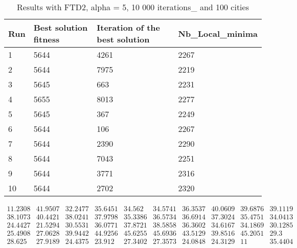 \documentclass[12pt,oneside,a4paper]{article}
\begin{document}
\begin{table}[h]
  \centering
  \small
  \begin{tabular}{llll}
    \hline
    \multicolumn{1}{|l|}{\textbf{Run}}& \multicolumn{1}{l|}{\textbf{Best solution fitness}}& \multicolumn{1}{l|}{\textbf{Iteration of the best solution}}& \multicolumn{1}{l|}{\textbf{Nb\_Local\_minima}}\\ \hline
    \multicolumn{1}{|l|}{1} & \multicolumn{1}{l|}{5644}  & \multicolumn{1}{l|}{4261} & \multicolumn{1}{l|}{2267}  \\ \hline
    \multicolumn{1}{|l|}{2} & \multicolumn{1}{l|}{5644}  & \multicolumn{1}{l|}{7975} & \multicolumn{1}{l|}{2219}  \\ \hline
    \multicolumn{1}{|l|}{3} & \multicolumn{1}{l|}{5645}  & \multicolumn{1}{l|}{663}  & \multicolumn{1}{l|}{2231}  \\ \hline
    \multicolumn{1}{|l|}{4} & \multicolumn{1}{l|}{5655}  & \multicolumn{1}{l|}{8013}  & \multicolumn{1}{l|}{2277}  \\ \hline
    \multicolumn{1}{|l|}{5} & \multicolumn{1}{l|}{5645}  & \multicolumn{1}{l|}{367}  & \multicolumn{1}{l|}{2249}  \\ \hline
    \multicolumn{1}{|l|}{6} & \multicolumn{1}{l|}{5644}  & \multicolumn{1}{l|}{106}  & \multicolumn{1}{l|}{2267}  \\ \hline
    \multicolumn{1}{|l|}{7} & \multicolumn{1}{l|}{5644}  & \multicolumn{1}{l|}{2390}  & \multicolumn{1}{l|}{2290}  \\ \hline
    \multicolumn{1}{|l|}{8} & \multicolumn{1}{l|}{5644}  & \multicolumn{1}{l|}{7043} & \multicolumn{1}{l|}{2251}  \\ \hline
    \multicolumn{1}{|l|}{9} & \multicolumn{1}{l|}{5644}  & \multicolumn{1}{l|}{3771} & \multicolumn{1}{l|}{2316}  \\ \hline
    \multicolumn{1}{|l|}{10} & \multicolumn{1}{l|}{5644}  & \multicolumn{1}{l|}{2702} & \multicolumn{1}{l|}{2320}  \\ \hline
  \end{tabular}
  \caption{Results with FTD2, alpha = 5, 10 000 iterations\_ and 100 cities}
\end{table}


\begin{equation}
  \tag{Mean Tabu Duration for each city (alpha = 5 and 50 cities)}
  \begin{smallmatrix} 11.2308 & 41.9507 & 32.2477 & 35.6451 & 34.562 & 34.5741 & 36.3537 & 40.0609 & 39.6876 & 39.1119\\
    38.1073 & 40.4421 & 38.0241 & 37.9798 & 35.3386 & 36.5734 & 36.6914 & 37.3024 & 35.4751 & 34.0413 \\ 
    24.4427 & 21.5294 & 30.5531 & 36.0771 & 37.8721 & 38.5858 & 36.3602 & 34.6167 & 34.1869 & 30.1285 \\
    25.4908 & 27.0628 & 39.9442  &44.9256 & 45.6255 & 45.6936 & 43.5129 & 39.8516 & 45.2051 & 29.3 \\
    28.625 & 27.9189 & 24.4375 & 23.912 & 27.3402 & 27.3573 & 24.0848 & 24.3129 & 11 & 35.4404 \\
  \end{smallmatrix}
\end{equation}
\end{document}
